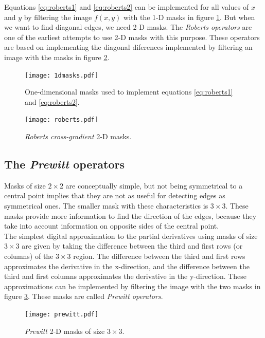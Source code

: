 \documentclass{ipol}
\numberwithin{equation}{section}
\numberwithin{table}{section}
\numberwithin{figure}{section}
\begin{document}
Equations \ref{eq:roberts1} and \ref{eq:roberts2} can be implemented for all values of $x$ and $y$
by filtering the image $f(x,y)$ with the 1-D masks in figure \ref{fig:1dmasks}. But when we want 
to find diagonal edges, we need 2-D masks. The \textit{Roberts operators} are one of the earliest 
attempts to use 2-D masks with this purpose. These operators are based on implementing the diagonal 
diferences implemented by filtering an image with the masks in figure \ref{fig:roberts}.\\

\begin{figure}
	\centering
	\texttt{[image: 1dmasks.pdf]}
	\caption{One-dimensional masks used to implement equations \ref{eq:roberts1} and \ref{eq:roberts2}.}
	\label{fig:1dmasks}
\end{figure}

\begin{figure}
	\centering
	\texttt{[image: roberts.pdf]}
	\caption{\textit{Roberts cross-gradient} 2-D masks.}
	\label{fig:roberts}
\end{figure}

\subsection{The \textit{Prewitt} operators}

Masks of size $2\times2$ are conceptually simple, but not being symmetrical to a central point implies 
that they are not as useful for detecting edges as symmetrical ones. The smaller mask with these characteristics is 
$3\times3$. These masks provide more information to find the direction of the edges, because they take 
into account information on opposite sides of the central point.\\

The simplest digital approximation to the partial derivatives using masks of size $3\times3$ are given 
by taking the difference between the third and first rows (or columns) of the $3\times3$ region. The
difference between the third and first rows approximates the derivative in the x-direction, and 
the difference between the third and first columns approximates the derivative in the y-direction.
These approximations can be implemented by filtering the image with the two masks in figure \ref{fig:prewitt}.
These masks are called \textit{Prewitt operators}.\\

\begin{figure}
	\centering
	\texttt{[image: prewitt.pdf]}
	\caption{\textit{Prewitt} 2-D masks of size $3\times3$.}
	\label{fig:prewitt}
\end{figure}
\end{document}
